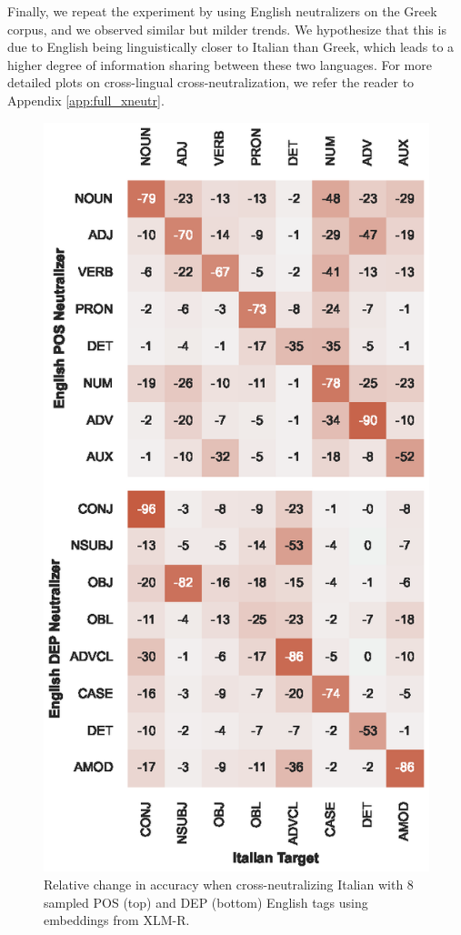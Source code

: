 \documentclass[11pt,a4paper]{article}
\begin{document}
Finally, we repeat the experiment by using English neutralizers on the Greek corpus, and we observed similar but milder trends. We hypothesize that this is due to English being linguistically closer to Italian than Greek, which leads to a higher degree of information sharing between these two languages. For more detailed plots on cross-lingual cross-neutralization, we refer the reader to Appendix \ref{app:full_xneutr}.

\begin{figure}[t]
\centering
\includegraphics[width=\columnwidth]{cross-lingual_it_from_en_multifigure_sampled.eps}
\caption{Relative change in accuracy when cross-neutralizing Italian with 8 sampled POS (top) and DEP (bottom) English tags using embeddings from XLM-R.}
\label{fig:crosslingual_xneutr_xlm}
\end{figure}
\end{document}
